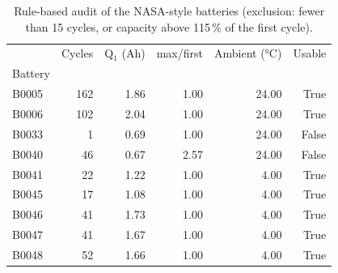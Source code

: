 \begin{table}[htbp]\centering\footnotesize
\begin{tabular}{lrrrrr}
\toprule
 & Cycles & Q$_1$ (Ah) & max/first & Ambient (°C) & Usable \\
Battery &  &  &  &  &  \\
\midrule
B0005 & 162 & 1.86 & 1.00 & 24.00 & True \\
B0006 & 102 & 2.04 & 1.00 & 24.00 & True \\
B0033 & 1 & 0.69 & 1.00 & 24.00 & False \\
B0040 & 46 & 0.67 & 2.57 & 24.00 & False \\
B0041 & 22 & 1.22 & 1.00 & 4.00 & True \\
B0045 & 17 & 1.08 & 1.00 & 4.00 & True \\
B0046 & 41 & 1.73 & 1.00 & 4.00 & True \\
B0047 & 41 & 1.67 & 1.00 & 4.00 & True \\
B0048 & 52 & 1.66 & 1.00 & 4.00 & True \\
\bottomrule
\end{tabular}
\caption{Rule-based audit of the NASA-style batteries (exclusion: fewer than 15 cycles, or capacity above 115\,\% of the first cycle).}\label{tab:agingaudit}
\end{table}
